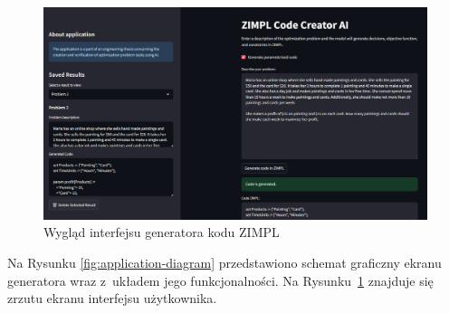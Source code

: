 \begin{figure}
    \centering
    \includegraphics[width=1\linewidth]{figures/app.png}
    \caption{Wygląd interfejsu generatora kodu ZIMPL}
    \label{fig:gui}
\end{figure}

Na Rysunku \ref{fig:application-diagram} przedstawiono schemat graficzny ekranu generatora wraz z~układem jego funkcjonalności. Na Rysunku~\ref{fig:gui} znajduje się zrzutu ekranu interfejsu użytkownika.








